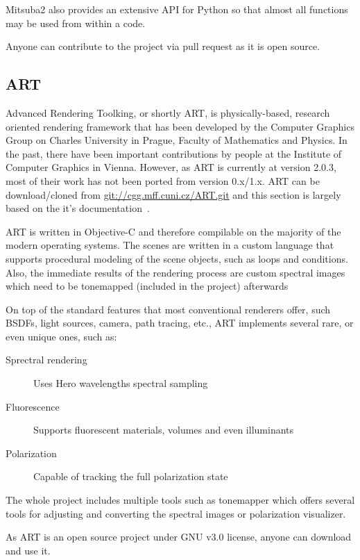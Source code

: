 Mitsuba2 also provides an extensive API for Python so that almost all functions may be used from within a code. 

Anyone can contribute to the project via pull request as it is open source.

\subsection{ART}

Advanced Rendering Toolking, or shortly ART, is physically-based, research oriented rendering framework that has been developed by the Computer Graphics Group on Charles University in Prague, Faculty of Mathematics and Physics. In the past, there have been important contributions by people at the Institute of Computer Graphics in Vienna. However, as ART is currently at version 2.0.3, most of their work has not been ported from version 0.x/1.x. ART can be download/cloned from \url{git://cgg.mff.cuni.cz/ART.git} and this section is largely based on the it's documentation~\cite{artDoc}.

ART is written in Objective-C and therefore compilable on the majority of the modern operating systems. The scenes are written in a custom language that supports procedural modeling of the scene objects, such as loops and conditions. Also, the immediate results of the rendering process are custom spectral images which need to be tonemapped (included in the project) afterwards

On top of the standard features that most conventional renderers offer, such BSDFs, light sources, camera, path tracing, etc., ART implements several rare, or even unique ones, such as:

\begin{description}
	\item[Sprectral rendering] Uses Hero wavelengths spectral sampling
	\item[Fluorescence] Supports fluorescent materials, volumes and even illuminants
	\item[Polarization] Capable of tracking the full polarization state
\end{description}

The whole project includes multiple tools such as tonemapper which offers several tools for adjusting and converting the spectral images or polarization visualizer.

As ART is an open source project under GNU v3.0 license, anyone can download and use it.

